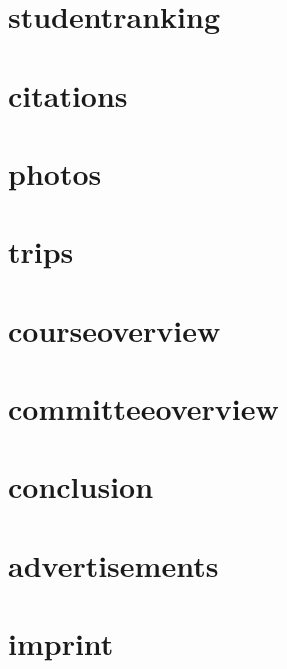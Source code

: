 \documentclass[a4paper, 13pt]{article}
\begin{document}
\part{studentranking}
\part{citations}
\part{photos}
\part{trips}
\part{courseoverview}
\part{committeeoverview}
\part{conclusion}
\part{advertisements}
\part{imprint}
\end{document}
